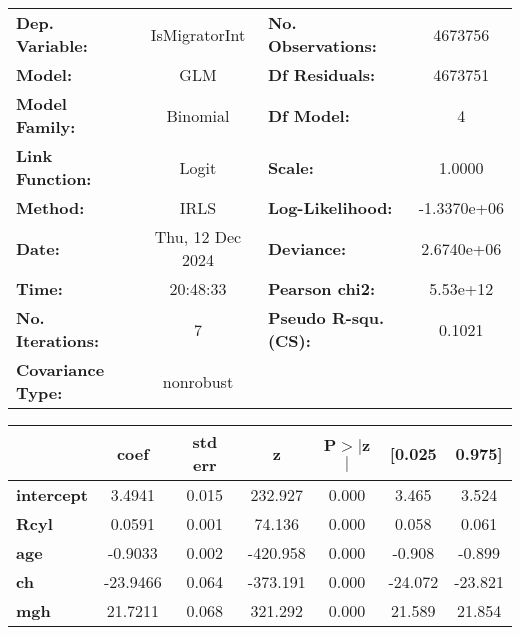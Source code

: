 \begin{center}
\begin{tabular}{lclc}
\toprule
\textbf{Dep. Variable:}   &  IsMigratorInt   & \textbf{  No. Observations:  } &   4673756    \\
\textbf{Model:}           &       GLM        & \textbf{  Df Residuals:      } &   4673751    \\
\textbf{Model Family:}    &     Binomial     & \textbf{  Df Model:          } &         4    \\
\textbf{Link Function:}   &      Logit       & \textbf{  Scale:             } &     1.0000   \\
\textbf{Method:}          &       IRLS       & \textbf{  Log-Likelihood:    } & -1.3370e+06  \\
\textbf{Date:}            & Thu, 12 Dec 2024 & \textbf{  Deviance:          } &  2.6740e+06  \\
\textbf{Time:}            &     20:48:33     & \textbf{  Pearson chi2:      } &   5.53e+12   \\
\textbf{No. Iterations:}  &        7         & \textbf{  Pseudo R-squ. (CS):} &    0.1021    \\
\textbf{Covariance Type:} &    nonrobust     & \textbf{                     } &              \\
\bottomrule
\end{tabular}
\begin{tabular}{lcccccc}
                   & \textbf{coef} & \textbf{std err} & \textbf{z} & \textbf{P$> |$z$|$} & \textbf{[0.025} & \textbf{0.975]}  \\
\midrule
\textbf{intercept} &       3.4941  &        0.015     &   232.927  &         0.000        &        3.465    &        3.524     \\
\textbf{Rcyl}      &       0.0591  &        0.001     &    74.136  &         0.000        &        0.058    &        0.061     \\
\textbf{age}       &      -0.9033  &        0.002     &  -420.958  &         0.000        &       -0.908    &       -0.899     \\
\textbf{ch}        &     -23.9466  &        0.064     &  -373.191  &         0.000        &      -24.072    &      -23.821     \\
\textbf{mgh}       &      21.7211  &        0.068     &   321.292  &         0.000        &       21.589    &       21.854     \\
\bottomrule
\end{tabular}
\end{center}